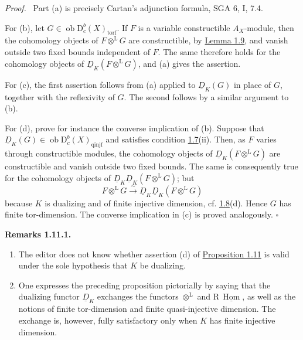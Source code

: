 \documentclass[11pt]{article}
\providecommand{\qedtext}{\hfill$\square$}
\newenvironment{statement}[1]{\par\medskip\noindent\textbf{#1.}\ }{\par\medskip}
\newenvironment{prooftext}[1][Proof]{\par\noindent\emph{#1.}\ }{\par\medskip}
\DeclareMathOperator{\Hom}{Hom}
\newcommand{\R}{\mathrm{R}}
\newcommand{\D}{\mathrm{D}}
\newcommand{\ob}{\operatorname{ob}}
\providecommand{\Hom}{\operatorname{Hom}}
\providecommand{\ob}{\operatorname{ob}}
\providecommand{\R}{\mathrm R}
\providecommand{\Hom}{\operatorname{Hom}}
\providecommand{\qedtext}{\hfill$\square$}
\begin{document}
\begin{prooftext}
Part (a) is precisely Cartan's adjunction formula, SGA 6, I, 7.4.

For (b), let $G\in\ob\D_c^b(X)_{\mathrm{torf}}$. If $F$ is a variable constructible $A_X$-module, then the cohomology objects of $F\otimes^{\mathrm L}G$ are constructible, by \hyperref[sga5:I:lemma:1.9]{Lemma 1.9}, and vanish outside two fixed bounds independent of $F$. The same therefore holds for the cohomology objects of $\underline D_K(F\otimes^{\mathrm L}G)$, and (a) gives the assertion.

For (c), the first assertion follows from (a) applied to $\underline D_K(G)$ in place of $G$, together with the reflexivity of $G$. The second follows by a similar argument to (b).

For (d), prove for instance the converse implication of (b). Suppose that $\underline D_K(G)\in\ob\D_c^b(X)_{\mathrm{qinjf}}$ and satisfies condition \hyperref[sga5:I:definition:1.7]{1.7}(ii). Then, as $F$ varies through constructible modules, the cohomology objects of $\underline D_K(F\otimes^{\mathrm L}G)$ are constructible and vanish outside two fixed bounds. The same is consequently true for the cohomology objects of $\underline D_K\underline D_K(F\otimes^{\mathrm L}G)$; but
\[
   F\otimes^{\mathrm L}G\xrightarrow{\sim}\underline D_K\underline D_K(F\otimes^{\mathrm L}G)
\]
because $K$ is dualizing and of finite injective dimension, cf. \hyperref[sga5:I:remark:1.8]{1.8}(d). Hence $G$ has finite tor-dimension. The converse implication in (c) is proved analogously. \qedtext
\end{prooftext}

\label{sga5:I:remark:1.11.1}\begin{statement}{Remarks 1.11.1}
\begin{enumerate}[label=\alph*)]
\item The editor does not know whether assertion (d) of \hyperref[sga5:I:proposition:1.11]{Proposition 1.11} is valid under the sole hypothesis that $K$ be dualizing.
\item One expresses the preceding proposition pictorially by saying that the dualizing functor $\underline D_K$ exchanges the functors $\otimes^{\mathrm L}$ and $\R\,\underline{\Hom}$, as well as the notions of finite tor-dimension and finite quasi-injective dimension. The exchange is, however, fully satisfactory only when $K$ has finite injective dimension.
\end{enumerate}
\end{statement}
\end{document}
